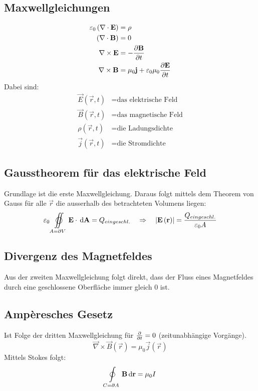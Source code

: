 \subsection{Maxwellgleichungen}
\begin{align}
\varepsilon_0 \left( \mathbf{\nabla} \cdot \mathbf{E} \right) &= \rho \\
\left( \mathbf{\nabla} \cdot \mathbf{B} \right) &= 0 \\
\mathbf{\nabla} \times \mathbf{E} &= - \frac{\partial \mathbf{B}}{\partial t} \\
\mathbf{\nabla} \times \mathbf{B} &= \mu_0 \mathbf{j} + \varepsilon_0 \mu_0 \frac{\partial \mathbf{E}}{\partial t}
\end{align}
Dabei sind: 
\begin{align*}
\vec{E} \left(\vec{r}, t \right) &= \text{das elektrische Feld} \\
\vec{B} \left(\vec{r}, t \right) &= \text{das magnetische Feld} \\
\rho \left( \vec{r}, t \right) &= \text{die Ladungsdichte} \\
\vec{j} \left( \vec{r}, t \right) &= \text{die Stromdichte}
\end{align*}
\subsection{Gausstheorem für das elektrische Feld}
Grundlage ist die erste Maxwellgleichung. Daraus folgt mittels dem Theorem von Gauss für alle $\vec{r}$ die ausserhalb des betrachteten Volumens liegen:
\begin{equation}
\varepsilon_0 \varoiint\limits_{A=\partial V}\vec{E}\cdot\d \vec{A} = Q_{eingeschl.} \quad\Rightarrow\quad \abs{\vec{E}\left(\vec{r}\right)} = \frac{Q_{eingeschl.}}{\varepsilon_0 A} 
\end{equation}
\subsection{Divergenz des Magnetfeldes}
Aus der zweiten Maxwellgleichung folgt direkt, dass der Fluss eines Magnetfeldes durch eine geschlossene Oberfläche immer gleich 0 ist.
\subsection{Ampèresches Gesetz}
Ist Folge der dritten Maxwellgleichung für $\frac{\partial }{\partial t} = 0$ (zeitunabhängige Vorgänge).
\begin{equation}
\vec{\nabla} \times \vec{B}\left(\vec{r}\right) = \mu_0 \vec{j}\left(\vec{r}\right)
\end{equation}
Mittels Stokes folgt:
\begin{equation}
\oint\limits_{C = \partial A} \mathbf{B} \,\mathrm{d} \mathbf{r} = \mu_0 I
\end{equation}
